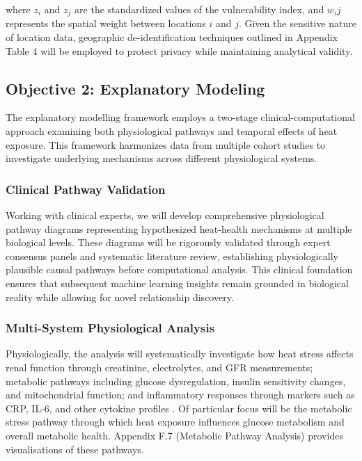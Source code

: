 where $ z_i$ and $ z_j$ are the standardized values of the vulnerability index, and $ w_ij$ represents the spatial weight between locations $ i$ and $ j$. Given the sensitive nature of location data, geographic de-identification techniques outlined in Appendix Table 4 will be employed to protect privacy while maintaining analytical validity.

\subsection{Objective 2: Explanatory Modeling}
The explanatory modelling framework employs a two-stage clinical-computational approach examining both physiological pathways and temporal effects of heat exposure. This framework harmonizes data from multiple cohort studies to investigate underlying mechanisms across different physiological systems.

\subsubsection{Clinical Pathway Validation}
Working with clinical experts, we will develop comprehensive physiological pathway diagrams representing hypothesized heat-health mechanisms at multiple biological levels. These diagrams will be rigorously validated through expert consensus panels and systematic literature review, establishing physiologically plausible causal pathways before computational analysis. This clinical foundation ensures that subsequent machine learning insights remain grounded in biological reality while allowing for novel relationship discovery.

\subsubsection{Multi-System Physiological Analysis}
Physiologically, the analysis will systematically investigate how heat stress affects renal function through creatinine, electrolytes, and GFR measurements; metabolic pathways including glucose dysregulation, insulin sensitivity changes, and mitochondrial function; and inflammatory responses through markers such as CRP, IL-6, and other cytokine profiles \citep{Desai2023}. Of particular focus will be the metabolic stress pathway through which heat exposure influences glucose metabolism and overall metabolic health. Appendix F.7 (Metabolic Pathway Analysis) provides visualisations of these pathways.

